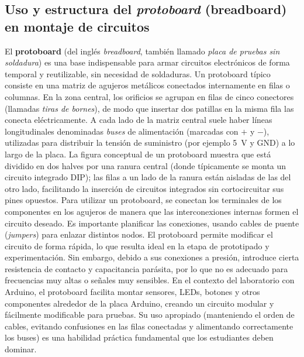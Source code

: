 \documentclass{article}
\begin{document}
\subsection{Uso y estructura del \textit{protoboard} (breadboard) en montaje de circuitos}
El \textbf{protoboard} (del inglés \textit{breadboard}, también llamado \textit{placa de pruebas sin soldadura}) es una base indispensable para armar circuitos electrónicos de forma temporal y reutilizable, sin necesidad de soldaduras. Un protoboard típico consiste en una matriz de agujeros metálicos conectados internamente en filas o columnas. En la zona central, los orificios se agrupan en filas de cinco conectores (llamadas \textit{tiras de bornes}), de modo que insertar dos patillas en la misma fila las conecta eléctricamente. A cada lado de la matriz central suele haber líneas longitudinales denominadas \textit{buses} de alimentación (marcadas con $+$ y $-$), utilizadas para distribuir la tensión de suministro (por ejemplo 5~V y GND) a lo largo de la placa.\cite{Hayes2016} La figura conceptual de un protoboard muestra que está dividido en dos halves por una ranura central (donde típicamente se monta un circuito integrado DIP); las filas a un lado de la ranura están aisladas de las del otro lado, facilitando la inserción de circuitos integrados sin cortocircuitar sus pines opuestos. Para utilizar un protoboard, se conectan los terminales de los componentes en los agujeros de manera que las interconexiones internas formen el circuito deseado. Es importante planificar las conexiones, usando cables de puente (\textit{jumpers}) para enlazar distintos nodos. El protoboard permite modificar el circuito de forma rápida, lo que resulta ideal en la etapa de prototipado y experimentación. Sin embargo, debido a sus conexiones a presión, introduce cierta resistencia de contacto y capacitancia parásita, por lo que no es adecuado para frecuencias muy altas o señales muy sensibles.\cite{Hayes2016} En el contexto del laboratorio con Arduino, el protoboard facilita montar sensores, LEDs, botones y otros componentes alrededor de la placa Arduino, creando un circuito modular y fácilmente modificable para pruebas. Su uso apropiado (manteniendo el orden de cables, evitando confusiones en las filas conectadas y alimentando correctamente los buses) es una habilidad práctica fundamental que los estudiantes deben dominar.\cite{Hayes2016}
\end{document}
